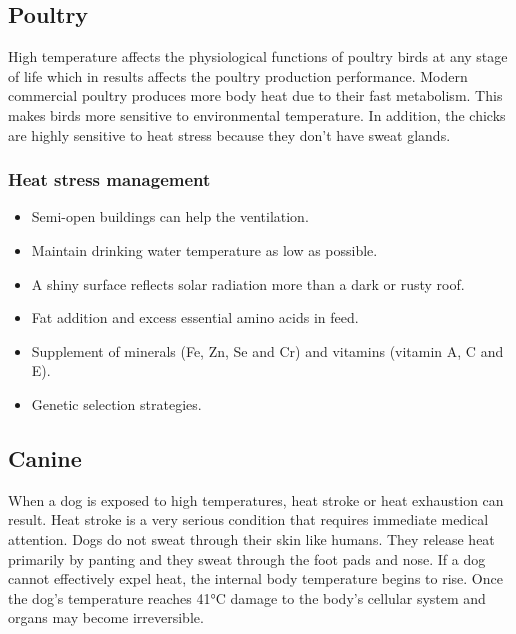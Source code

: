 \documentclass[]{book}
\providecommand{\tightlist}{%
  \setlength{\itemsep}{0pt}\setlength{\parskip}{0pt}}
\begin{document}
\hypertarget{poultry}{%
\subsection{Poultry}\label{poultry}}

High temperature affects the physiological functions of poultry birds at any stage of life which in results affects the poultry production performance. Modern commercial poultry produces more body heat due to their fast metabolism. This makes birds more sensitive to environmental temperature. In addition, the chicks are highly sensitive to heat stress because they don't have sweat glands.

\hypertarget{heat-stress-management-2}{%
\subsubsection{Heat stress management}\label{heat-stress-management-2}}

\begin{itemize}
\tightlist
\item
  Semi-open buildings can help the ventilation.
\item
  Maintain drinking water temperature as low as possible.
\item
  A shiny surface reflects solar radiation more than a dark or rusty roof.
\item
  Fat addition and excess essential amino acids in feed.
\item
  Supplement of minerals (Fe, Zn, Se and Cr) and vitamins (vitamin A, C and E).
\item
  Genetic selection strategies.
\end{itemize}

\hypertarget{canine}{%
\subsection{Canine}\label{canine}}

When a dog is exposed to high temperatures, heat stroke or heat exhaustion can result. Heat stroke is a very serious condition that requires immediate medical attention. Dogs do not sweat through their skin like humans. They release heat primarily by panting and they sweat through the foot pads and nose. If a dog cannot effectively expel heat, the internal body temperature begins to rise. Once the dog's temperature reaches 41°C damage to the body's cellular system and organs may become irreversible.
\end{document}
